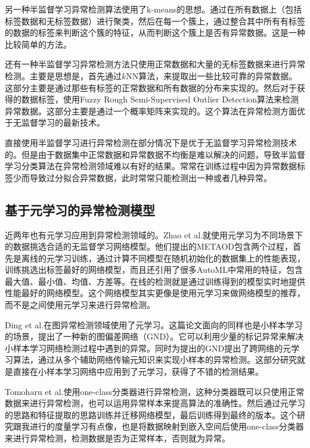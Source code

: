 另一种半监督学习异常检测算法使用了k-means的思想。通过在所有数据上（包括标签数据和无标签数据）进行聚类，然后在每一个簇上，通过整合其中所有有标签的数据的标签来判断这个簇的特征，从而判断这个簇上是否有异常数据\cite{DBLP:conf/sac/GaoCT06}。这是一种比较简单的方法。

还有一种半监督学习异常检测方法只使用正常数据和大量的无标签数据来进行异常检测\cite{DBLP:journals/ijait/DaneshpazhouhS15}。主要是思想是，首先通过$k$NN算法，来提取出一些比较可靠的异常数据。这部分主要是通过那些有标签的正常数据和所有数据的分布来实现的。然后对于获得的数据标签，使用Fuzzy Rough Semi-Supervised Outlier Detection\cite{DBLP:journals/mcs/XueSF10}算法来检测异常数据。这部分主要是通过一个概率矩阵来实现的。这个算法在异常检测方面优于无监督学习的最新技术。

直接使用半监督学习进行异常检测在部分情况下是优于无监督学习异常检测技术的。但是由于数据集中正常数据和异常数据不均衡是难以解决的问题，导致半监督学习分类算法在异常检测领域难以有好的结果。常常在训练过程中因为异常数据标签少而导致过分拟合异常数据，此时常常只能检测出一种或者几种异常。

\subsection{基于元学习的异常检测模型}

近两年也有元学习应用到异常检测领域的。Zhao et al.\cite{DBLP:journals/corr/abs-2009-10606}就使用元学习为不同场景下的数据挑选合适的无监督学习网络模型。他们提出的METAOD包含两个过程，首先是离线的元学习训练，通过计算不同模型在随机初始化的数据集上的性能表现，训练挑选出标签最好的网络模型，而且还引用了很多AutoML中常用的特征，包含最大值、最小值、均值、方差等。在线的检测就是通过训练得到的模型实时地提供性能最好的网络模型。这个网络模型其实更像是使用元学习来做网络模型的推荐，而不是之间使用元学习来进行异常检测。

Ding et al.\cite{DBLP:conf/www/DingZT021}在图异常检测领域使用了元学习。这篇论文面向的同样也是小样本学习的场景，提出了一种新的图偏差网络（GND）。它可以利用少量的标记异常来解决小样本学习网络检测过程中遇到的异常。同时为提出的GND提出了跨网络的元学习算法，通过从多个辅助网络传输元知识来实现小样本的异常检测。这部分研究就是直接在小样本学习网络中应用到了元学习，获得了不错的检测结果。

Tomoharu et al.\cite{DBLP:journals/corr/abs-2103-00684}使用one-class分类器进行异常检测，这种分类器既可以只使用正常数据来进行异常检测，也可以运用异常样本来提高算法的准确性。然后通过元学习的思路和特征提取的思路训练并迁移网络模型，最后训练得到最终的版本。这个研究跟我进行的度量学习有点像，也是将数据映射到嵌入空间后使用one-class分类器来进行异常检测，检测数据是否为正常样本，否则就为异常。

